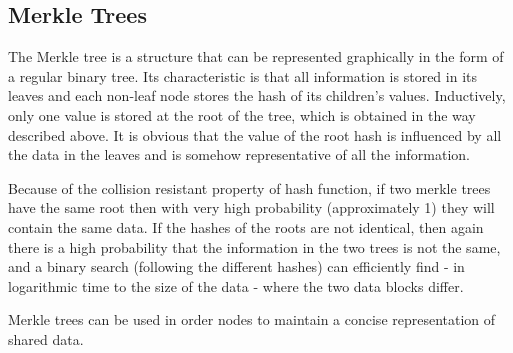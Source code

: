 \subsection{Merkle Trees}

The Merkle tree is a structure that can be represented graphically in the form of a regular binary tree. Its characteristic is that all information is stored in its leaves and each non-leaf node stores the hash of its children's values. Inductively, only one value is stored at the root of the tree, which is obtained in the way described above. It is obvious that the value of the root hash is influenced by all the data in the leaves and is somehow representative of all the information. 

Because of the collision resistant property of hash function, if two merkle trees have the same root then with very high probability (approximately 1) they will contain the same data. If the hashes of the roots are not identical, then again there is a high probability that the information in the two trees is not the same, and a binary search (following the different hashes) can efficiently find - in logarithmic time to the size of the data - where the two data blocks differ.

Merkle trees can be used in order nodes to maintain a concise representation of shared data.